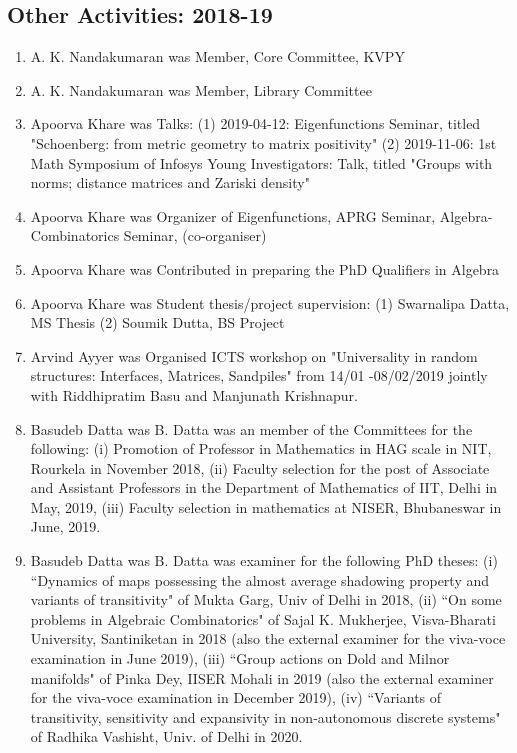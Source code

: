\subsection{Other Activities: 2018-19}
\begin{enumerate}
\item A. K. Nandakumaran was Member, Core Committee, KVPY
\item A. K. Nandakumaran was Member, Library Committee
\item Apoorva Khare was Talks: (1) 2019-04-12: Eigenfunctions Seminar, titled "Schoenberg: from metric geometry to matrix positivity" (2) 2019-11-06: 1st Math Symposium of Infosys Young Investigators: Talk, titled "Groups with norms; distance matrices and Zariski density"
\item Apoorva Khare was Organizer of Eigenfunctions,  APRG Seminar, Algebra-Combinatorics Seminar, (co-organiser)
\item Apoorva Khare was Contributed in preparing the PhD Qualifiers in Algebra
\item Apoorva Khare was Student thesis/project supervision: (1) Swarnalipa Datta, MS Thesis (2) Soumik Dutta, BS Project
\item Arvind Ayyer was Organised ICTS workshop on "Universality in random structures: Interfaces, Matrices, Sandpiles" from 14/01 -08/02/2019 jointly with Riddhipratim Basu and Manjunath Krishnapur.
\item Basudeb Datta was B. Datta was an member of the Committees for the following: (i)  Promotion of Professor in Mathematics in HAG scale in NIT, Rourkela in November 2018, (ii) Faculty selection for the post of Associate and Assistant Professors in the Department of Mathematics of IIT, Delhi in May, 2019, (iii) Faculty selection in mathematics at NISER, Bhubaneswar in June, 2019.
\item Basudeb Datta was B. Datta was  examiner for the following PhD theses:  (i) ``Dynamics of maps possessing the almost average shadowing property and variants of transitivity" of Mukta Garg, Univ of Delhi in 2018, (ii) ``On some problems in Algebraic Combinatorics" of Sajal K. Mukherjee, Visva-Bharati University, Santiniketan in 2018 (also the external examiner for the viva-voce examination  in June 2019), (iii) ``Group actions on Dold and Milnor manifolds" of Pinka Dey, IISER Mohali in 2019 (also the external examiner for the viva-voce examination in December 2019), (iv) ``Variants of transitivity, sensitivity and expansivity in non-autonomous discrete systems" of Radhika Vashisht,  Univ. of Delhi in 2020. 

\end{enumerate}
